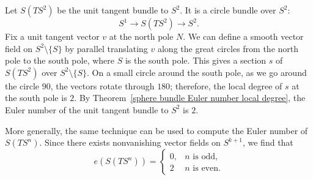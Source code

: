 \begin{example}
Let $S(TS^2)$ be the unit tangent bundle to $S^2$. It is a circle bundle over $S^2$:
\[S^1\to S(TS^2)\to S^2.\]
Fix a unit tangent vector $v$ at the north pole $N$. We can define a smooth vector field on $S^2\setminus\{S\}$ by parallel translating $v$ along the great circles from 
the north pole to the south pole, where $S$ is the south pole. This gives a section $s$ of $S(TS^2)$ over $S^2\setminus\{S\}$. On a small circle around the south pole, 
as we go around the circle $90$, the vectors rotate through $180$; therefore, the local degree of $s$ at the south pole is $2$. By 
Theorem~\ref{sphere bundle Euler number local degree}, the Euler number of the unit tangent bundle to $S^2$ is $2$.\par
More generally, the same technique can be used to compute the Euler number of $S(TS^n)$. Since there exists nonvanishing vector fields on $S^{k+1}$, we find that
\[e(S(TS^n))=\begin{cases}
0,&\text{$n$ is odd},\\
2&\text{$n$ is even}.
\end{cases}\]
\end{example}
